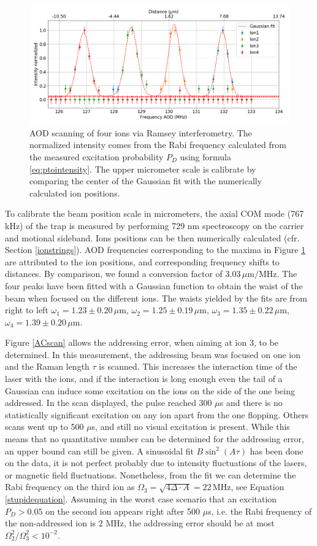 \begin{figure}
\centering
\includegraphics[width=\textwidth]{img/AODScan}
\caption{AOD scanning of four ions via Ramsey interferometry. The normalized intensity comes from the Rabi frequency calculated from the measured excitation probability $P_D$ using formula \eqref{eq:ptointensity}. The upper micrometer scale is calibrate by comparing the center of the Gaussian fit with the numerically calculated ion positions.}
\label{AODscan}
\end{figure}
To calibrate the beam position scale in micrometers, the axial COM mode (767 kHz) of the trap is measured by performing 729 nm spectroscopy on the carrier and motional sideband. Ions positions can be then numerically calculated (cfr. Section \ref{ionstrings}). AOD frequencies corresponding to the maxima in Figure \ref{AODscan} are attributed to the ion positions, and corresponding frequency shifts to distances. By comparison, we found a conversion factor of $3.03\,\mu\text{m}/\text{MHz}$.
The four peaks have been fitted with a Gaussian function to obtain the waist of the beam when focused on the different ions. The waists yielded by the fits are from right to left $\omega_1 = 1.23\pm 0.20\,\mu$m, $\omega_2 = 1.25\pm 0.19\,\mu$m, $ \omega_3 = 1.35\pm 0.22\,\mu$m, $\omega_4 = 1.39\pm 0.20\,\mu$m.\par
Figure \ref{ACscan} allows the addressing error, when aiming at ion 3, to be determined. In this measurement, the addressing beam was focused on one ion and the Raman length $\tau$ is scanned. This increases the interaction time of the laser with the ions, and if the interaction is long enough even the tail of a Gaussian can induce some excitation on the ions on the side of the one being addressed. In the scan displayed, the pulse reached 300 $\mu$s and there is no statistically significant excitation on any ion apart from the one flopping. Others scans went up to 500 $\mu$s, and still no visual excitation is present. While this means that no quantitative number can be determined for the addressing error, an upper bound can still be given. A sinusoidal fit $B\sin^2(A\tau)$ has been done on the data, it is not perfect probably due to intensity fluctuations of the lasers, or magnetic field fluctuations. Nonetheless, from the fit we can determine the Rabi frequency on the third ion as $\Omega_3 = \sqrt{4\Delta \cdot A} = 22\,\text{MHz}$, see Equation \eqref{stupidequation}. Assuming in the worst case scenario that an excitation $P_D>0.05$ on the second ion appears right after 500 $\mu$s, i.e. the Rabi frequency of the non-addressed ion is $2$ MHz, the addressing error should be at most $\Omega_2^2/\Omega_3^2< 10^{-2}$.\par

